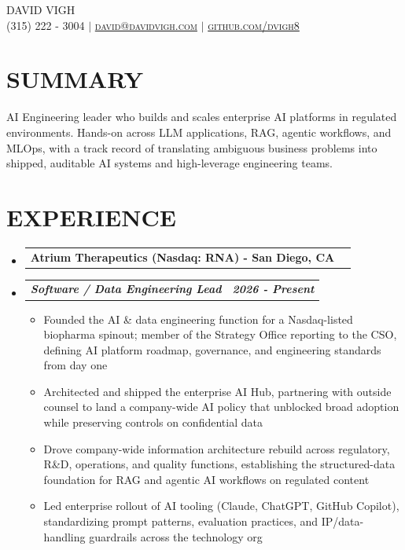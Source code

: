 \documentclass[letterpaper,11pt]{article}
\makeatletter
\newcommand{\resumeItem}[1]{
  \item\small{
    {#1 \vspace{0pt}}
  }
}
\newcommand{\resumeSubheading}[2]{
  \vspace{-1pt}\item
    \begin{tabular*}{0.97\textwidth}[t]{l@{\extracolsep{\fill}}r}
      \textbf{\small#1 - \small#2}
    \end{tabular*}\vspace{-4pt}
}
\newcommand{\resumeSubSubheading}[2]{
    \item
    \vspace{0pt}
    \begin{tabular*}{0.97\textwidth}{l@{\extracolsep{\fill}}r}
      \textbf{\textit{\small#1}} & \textbf{\textit{\small#2}} \\
    \end{tabular*}\vspace{-7pt}
}
\newcommand{\resumeHeadingListStart}{\begin{itemize}[leftmargin=0.05in, label={}, itemsep=0pt, topsep=0pt]}
\newcommand{\resumeHeadingListEnd}{\end{itemize}}
\newcommand{\resumeSubHeadingListStart}{\begin{itemize}[leftmargin=0.15in, label={}, itemsep=0pt, topsep=0pt]}
\newcommand{\resumeSubHeadingListEnd}{\end{itemize}\vspace{0pt}}
\newcommand{\resumeItemListStart}{\begin{itemize}[leftmargin=0.15in, itemsep=0pt, topsep=0pt]}
\newcommand{\resumeItemListEnd}{\end{itemize}\vspace{-4pt}}
\makeatother
\begin{document}
\thispagestyle{fancy}
\fancyhf{} %
\fancyheadoffset[R]{-0.1cm}

\begin{center}
    \Huge \scshape DAVID VIGH \\ \vspace{1pt}
    \small (315) 222 - 3004 $|$ 
    \href{mailto:david@davidvigh.com}{david@davidvigh.com} $|$ 
    \href{https://github.com/dvigh8}{github.com/dvigh8} \\ \vspace{-5pt}
\end{center}

\section{\textbf{SUMMARY}}
    \begin{itemize}[leftmargin=0.05in, label={}]
        \small{\item{
            AI Engineering leader who builds and scales enterprise AI platforms in regulated environments. Hands-on across LLM applications, RAG, agentic workflows, and MLOps, with a track record of translating ambiguous business problems into shipped, auditable AI systems and high-leverage engineering teams.
        }}
    \end{itemize}\vspace{-14pt}

\section{\textbf{EXPERIENCE}}
    \resumeHeadingListStart
        \resumeSubheading{Atrium Therapeutics (Nasdaq: RNA)}{San Diego, CA}
    \resumeHeadingListEnd
        \resumeSubHeadingListStart
            \resumeSubSubheading {Software / Data Engineering Lead}{2026 - Present}
            \resumeItemListStart
                \resumeItem{Founded the AI \& data engineering function for a Nasdaq-listed biopharma spinout; member of the Strategy Office reporting to the CSO, defining AI platform roadmap, governance, and engineering standards from day one}
                \resumeItem{Architected and shipped the enterprise AI Hub, partnering with outside counsel to land a company-wide AI policy that unblocked broad adoption while preserving controls on confidential data}
                \resumeItem{Drove company-wide information architecture rebuild across regulatory, R\&D, operations, and quality functions, establishing the structured-data foundation for RAG and agentic AI workflows on regulated content}
                \resumeItem{Led enterprise rollout of AI tooling (Claude, ChatGPT, GitHub Copilot), standardizing prompt patterns, evaluation practices, and IP/data-handling guardrails across the technology org}
            \resumeItemListEnd
        \resumeSubHeadingListEnd
\end{document}
